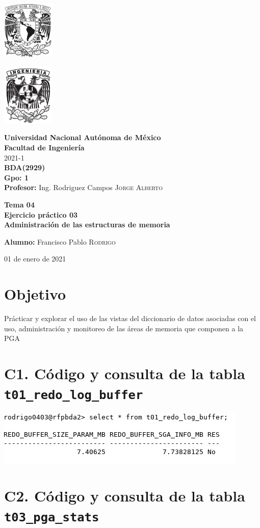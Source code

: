 \documentclass{article}
\newcommand{\coverPage}{
\thispagestyle{empty}
  \begin{minipage}[t][5cm][t]{0.2\linewidth}
    \includegraphics[width=2.5cm]{unam.jpg}

    \vspace{10cm}

    \includegraphics[width=2.5cm]{fiblack}
  \end{minipage}
  \begin{minipage}[t]{0.7\linewidth}
    \vspace{-2.5cm}
    \LARGE{\textbf{\university}}\\
    \Large{\textbf{\faculty}} \\
  
    \large{\semestre}\\[2cm]
  
    \large{\textbf{\materia (\clave)}}\\
    \large{\textbf{Gpo: \grupo}}\\[5mm]
    \large{\textbf{Profesor:} \profesor}\\ [1.5cm]
    \begin{center}
        \LARGE{\textbf{\actividad}}\\
        \LARGE{\textbf{\titulo}}\\
    \end{center}
  
    \vspace{3.3cm}
  
    \large{\textbf{Alumno:} \alumno} \\[1.5cm]
  
    \begin{flushright}
        \fechaEntrega%
    \end{flushright}
  \end{minipage}

\newpage
}
\begin{document}

\newcommand{\university}{Universidad Nacional Autónoma de México}
\newcommand{\faculty}{Facultad de Ingeniería}
\newcommand{\semestre}{2021-1}
\newcommand{\materia}{BDA}
\newcommand{\clave}{2929}
\newcommand{\grupo}{1}
\newcommand{\profesor}{Ing. Rodriguez Campos \textsc{Jorge Alberto}}

\newcommand{\alumno}{Francisco Pablo \textsc{Rodrigo}}
\newcommand{\actividad}{Tema 04 \\ Ejercicio práctico 03}
\newcommand{\titulo}{Administración de las estructuras de memoria}

\newcommand{\fechaEntrega}{01 de enero de 2021}

\newcommand{\codedir}{tema04-ej-prac-03-codigo}
\graphicspath{{assets/}{tema04-ej-prac-03.assets/}}

\coverPage%



\section*{Objetivo}

Prácticar y explorar el uso de las vistas del diccionario de datos asociadas 
con el uso, administración y monitoreo de las áreas de memoria que componen
a la PGA

\section*{C1. Código y consulta de la tabla \texttt{t01\_redo\_log\_buffer}}



\includegraphics[width=0.5\linewidth]{c1}

\section*{C2. Código y consulta de la tabla \texttt{t03\_pga\_stats}}
\end{document}
